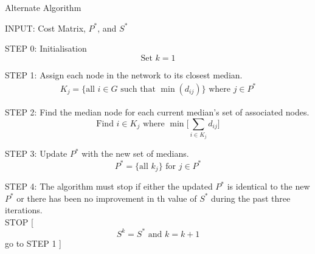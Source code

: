 \documentclass[11pt]{article}
\begin{document}
\begin{algorithm}
	\caption{Alternate Algorithm}
	\begin{algorithmic}[0]
		\Statex 
		\Statex INPUT: Cost Matrix, $P^*$, and $S^*$
		
		\Statex 
		\Statex STEP 0: Initialisation
		\Statex 
		\begin{equation*}
		\text{Set } k = 1
		\end{equation*}
		
		\Statex 
		\Statex STEP 1: Assign each node in the network to its closest median.
		\begin{align*}
		K_j=\{\text{all } i \in G \text{ such that }\min (d_{ij})\} \text{ where } j \in P^*
		\end{align*}
		
		\Statex 
		\Statex STEP 2: Find the median node for each current median's set of associated nodes.
		\begin{equation*}
		\text{Find } i \in K_j \text{ where } \min \bigg[ \sum_{i\in K_j} d_{ij} \bigg] 
		\end{equation*}

		
		\Statex 
		\Statex STEP 3: Update $P^*$ with the new set of medians.
		\begin{equation*}
		P^{*} = \{\text{all } k_j  \} \text{ for } j \in P^*
		\end{equation*}
		
		\Statex 
		\Statex STEP 4: The algorithm must stop if either the updated $P^*$ is identical to the new $P^*$ or there has been no improvement in th value of $S^*$ during the past three iterations.\\
		
		\Statex STOP
		[
		\Else
		\begin{equation*}
		S^k = S^* \text{ and } k = k+1
		\end{equation*}
		\Statex go to STEP 1
		]
		\EndIf
				
	\end{algorithmic}
\end{algorithm}
		
		
\end{document}
